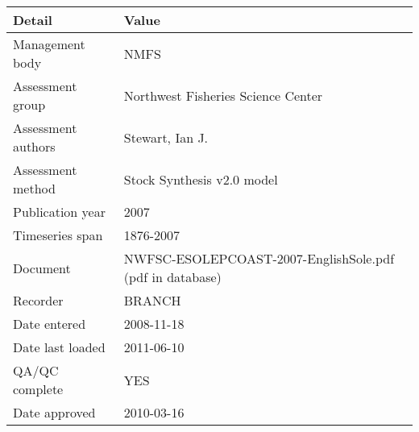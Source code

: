 \begin{table}[htb]
\centering
\begin{tabular}{lp{7cm}}
\toprule
Detail & Value \\
\midrule
Management body    & NMFS                                                     \\
Assessment group   & Northwest Fisheries Science Center                       \\
Assessment authors & Stewart, Ian J.                                          \\
Assessment method  & Stock Synthesis v2.0 model                               \\
Publication year   & 2007                                                     \\
Timeseries span    & 1876-2007                                                \\
Document           & NWFSC-ESOLEPCOAST-2007-EnglishSole.pdf (pdf in database) \\
Recorder           & BRANCH                                                   \\
Date entered       & 2008-11-18                                               \\
Date last loaded   & 2011-06-10                                               \\
QA/QC complete     & YES                                                      \\
Date approved      & 2010-03-16                                               \\
\bottomrule
\end{tabular}
\label{tab:assessdet}
\end{table}
